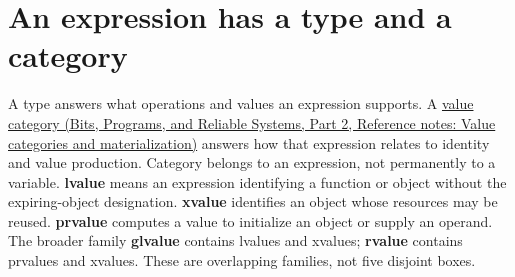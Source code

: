 \section{An expression has a type and a category}\label{05-engine-i-ch003-an-expression-has-a-type-and-a-category}

\hypertarget{05-engine-i-ch003-an-expression-has-a-type-and-a-category}{}

A type answers what operations and values an expression supports. A \href{../01-Bits-Programs-and-Reliable-Systems-P02/main.pdf\#appendix-1121b30eaeb0}{value category (Bits, Programs, and Reliable Systems, Part 2, Reference notes: Value categories and materialization)} answers how that expression relates to identity and value production. Category belongs to an expression, not permanently to a variable. \textbf{lvalue} means an expression identifying a function or object without the expiring-object designation. \textbf{xvalue} identifies an object whose resources may be reused. \textbf{prvalue} computes a value to initialize an object or supply an operand. The broader family \textbf{glvalue} contains lvalues and xvalues; \textbf{rvalue} contains prvalues and xvalues. These are overlapping families, not five disjoint boxes.

